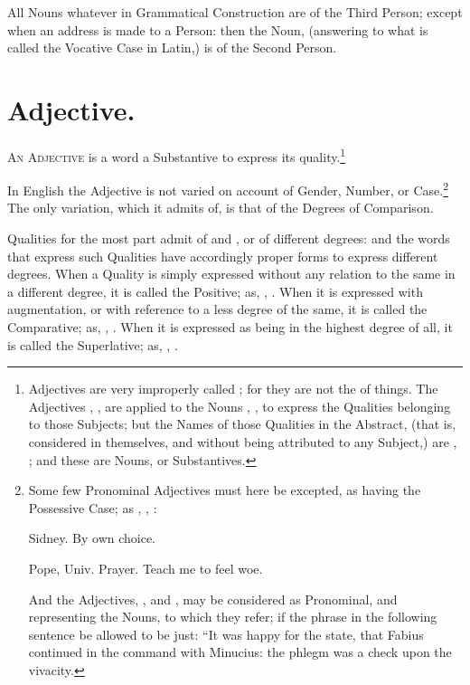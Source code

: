 All Nouns whatever in Grammatical Construction are of the Third Person;
except when an address is made to a Person: then the Noun, (answering to
what is called the Vocative Case in Latin,) is of the Second Person.

\section{Adjective.}

\textsc{An Adjective} is a word  a Substantive to express
its quality.\footnote{Adjectives are very improperly called ;
  for they are not the  of things. The Adjectives ,
  , are applied to the Nouns , , to express
  the Qualities belonging to those Subjects; but the Names of those
  Qualities in the Abstract, (that is, considered in themselves, and
  without being attributed to any Subject,) are ,
  ; and these are Nouns, or Substantives.}

In English the Adjective is not varied on account of Gender, Number, or
Case.\footnote{Some few Pronominal Adjectives must here be excepted, as
  having the Possessive Case; as , , :

  \begin{aquote}{Sidney.}
    By  own choice.
  \end{aquote}

  \begin{aquote}{Pope, Univ. Prayer.}
    Teach me to feel  woe.
  \end{aquote}

  And the Adjectives, , and , may be considered as
  Pronominal, and representing the Nouns, to which they refer; if the
  phrase in the following sentence be allowed to be just: ``It was happy
  for the state, that Fabius continued in the command with Minucius: the
   phlegm was a check upon the  vivacity.} The
only variation, which it admits of, is that of the Degrees of
Comparison.

Qualities for the most part admit of  and , or of
different degrees: and the words that express such Qualities have
accordingly proper forms to express different degrees. When a Quality is
simply expressed without any relation to the same in a different degree,
it is called the Positive; as, , . When it is
expressed with augmentation, or with reference to a less degree of the
same, it is called the Comparative; as, , . When
it is expressed as being in the highest degree of all, it is called the
Superlative; as, , .

